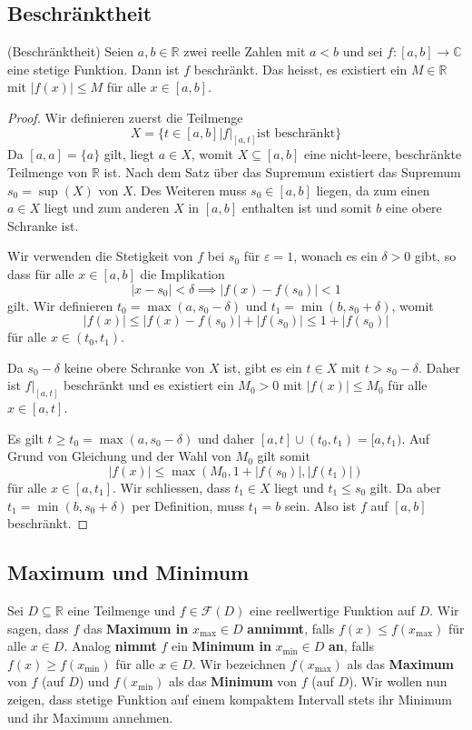 \documentclass[../Analysis1_script.tex]{subfiles}
\begin{document}
	
\subsection{Beschränktheit}

\begin{proposition}{(Beschränktheit)}\label{satz:beschrkompintervall}
	Seien $a, b \in \mathbb{R}$ zwei reelle Zahlen mit $a < b$ und sei $f: [a, b] \to \mathbb{C}$ eine stetige Funktion. Dann ist $f$ beschränkt. Das heisst, es existiert ein $M \in \mathbb{R}$ mit $|f(x)| \leq M$ für alle $x \in [a, b]$.
\end{proposition}

\begin{proof}
	Wir definieren zuerst die Teilmenge
	\[X = \{t \in [a, b] | f|_[a, t] \text{ist beschränkt}\}\]
	Da $[a, a] = \{a\}$ gilt, liegt $a \in X$, womit $X \subseteq [a, b]$ eine nicht-leere, beschränkte Teilmenge von $\mathbb{R}$ ist. Nach dem Satz über das Supremum existiert das Supremum $s_0 = \sup(X)$ von $X$. Des Weiteren muss $s_0 \in [a, b]$ liegen, da zum einen $a \in X$ liegt und zum anderen $X$ in $[a, b]$ enthalten ist und somit $b$ eine obere Schranke ist.
	
	Wir verwenden die Stetigkeit von $f$ bei $s_0$ für $\varepsilon = 1$, wonach es ein $\delta > 0$ gibt, so dass für alle $x \in [a, b]$ die Implikation
	\[|x - s_0| < \delta \implies |f(x) - f(s_0)| < 1\]
	gilt. Wir definieren $t_0 = \max(a, s_0 - \delta)$ und $t_1 = \min(b, s_0 + \delta)$, womit 
	\[|f(x)| \leq |f(x) - f(s_0)| + |f(s_0)| \leq 1 + |f(s_0)|\]
	für alle $x \in (t_0, t_1)$.
	
	Da $s_0 - \delta$ keine obere Schranke von $X$ ist, gibt es ein $t \in X$ mit $t > s_0 - \delta$. Daher ist $f|_[a, t]$ beschränkt und es existiert ein $M_0 > 0$ mit $|f(x)| \leq M_0$ für alle $x \in [a, t]$.
	
	Es gilt $t \geq t_0 = \max(a, s_0 - \delta)$ und daher $[a, t] \cup (t_0, t_1) = [a, t_1)$. Auf Grund von Gleichung und der Wahl von $M_0$ gilt somit
	\[|f(x)| \leq \max(M_0, 1 + |f(s_0)|, |f(t_1)|)\]
	für alle $x \in [a, t_1]$. Wir schliessen, dass $t_1 \in X$ liegt und $t_1 \leq s_0$ gilt. Da aber $t_1 = \min(b, s_0 + \delta)$ per Definition, muss $t_1 = b$ sein. Also ist $f$ auf $[a, b]$ beschränkt. 
\end{proof}

\subsection{Maximum und Minimum}
	Sei $D \subseteq \mathbb{R}$ eine Teilmenge und $f\in \mathcal {F}(D)$ eine reellwertige Funktion auf $D$. Wir sagen, dass $f$ das \textbf{Maximum in} $x_{\max }\in D$ \textbf{annimmt}, falls $f(x) \leq f(x_{\max })$ für alle $x\in D$. Analog \textbf{nimmt} $f$ ein \textbf{Minimum in} $x_{\min } \in D$ \textbf{an}, falls $f(x) \geq f(x_{\min })$ für alle $x \in D$. Wir bezeichnen $f(x_{\max })$ als das \textbf{Maximum} von $f$ (auf $D$) und $f(x_{\min })$ als das \textbf{Minimum} von $f$ (auf $D$). Wir wollen nun zeigen, dass stetige Funktion auf einem kompaktem Intervall stets ihr Minimum und ihr Maximum annehmen.
	
\end{document}
